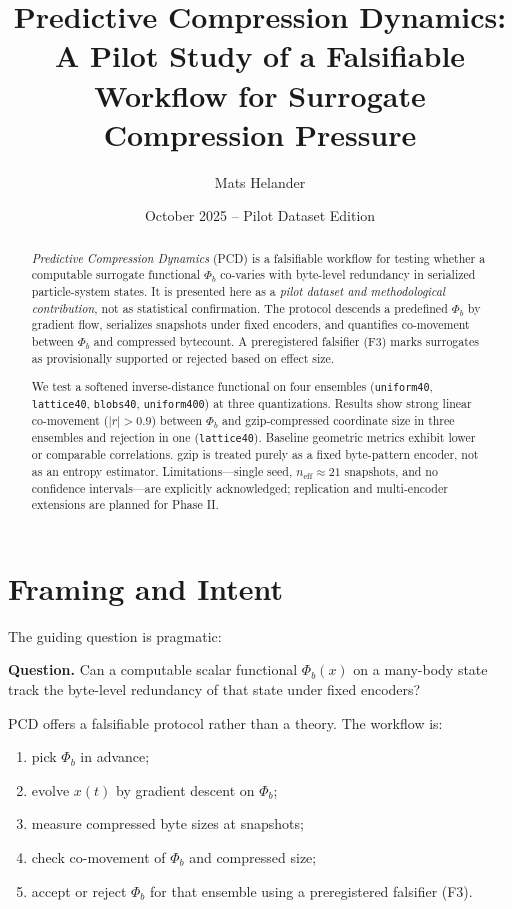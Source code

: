 \documentclass[11pt,a4paper]{article}
\title{\bf Predictive Compression Dynamics:\\
A Pilot Study of a Falsifiable Workflow for Surrogate Compression Pressure}
\author{Mats Helander}
\date{October 2025 -- Pilot Dataset Edition}
\newcommand{\phib}{\Phi_b}
\begin{document}
\maketitle

\begin{abstract}
\emph{Predictive Compression Dynamics} (PCD) is a falsifiable workflow for testing whether a computable surrogate functional $\phib$ co-varies with byte-level redundancy in serialized particle-system states. It is presented here as a \emph{pilot dataset and methodological contribution}, not as statistical confirmation. The protocol descends a predefined $\phib$ by gradient flow, serializes snapshots under fixed encoders, and quantifies co-movement between $\phib$ and compressed bytecount. A preregistered falsifier (F3) marks surrogates as provisionally supported or rejected based on effect size.

We test a softened inverse-distance functional on four ensembles (\texttt{uniform40}, \texttt{lattice40}, \texttt{blobs40}, \texttt{uniform400}) at three quantizations. Results show strong linear co-movement ($|r|\!>\!0.9$) between $\phib$ and gzip-compressed coordinate size in three ensembles and rejection in one (\texttt{lattice40}). Baseline geometric metrics exhibit lower or comparable correlations. gzip is treated purely as a fixed byte-pattern encoder, not as an entropy estimator. Limitations---single seed, $n_{\text{eff}}\!\approx\!21$ snapshots, and no confidence intervals---are explicitly acknowledged; replication and multi-encoder extensions are planned for Phase II.
\end{abstract}

\section{Framing and Intent}
The guiding question is pragmatic:

\medskip
\noindent
\textbf{Question.} Can a computable scalar functional $\phib(x)$ on a many-body state track the byte-level redundancy of that state under fixed encoders?

\medskip
PCD offers a falsifiable protocol rather than a theory. The workflow is:

\begin{enumerate}
\item pick $\phib$ in advance;
\item evolve $x(t)$ by gradient descent on $\phib$;
\item measure compressed byte sizes at snapshots;
\item check co-movement of $\phib$ and compressed size;
\item accept or reject $\phib$ for that ensemble using a preregistered falsifier (F3).
\end{enumerate}
\end{document}
